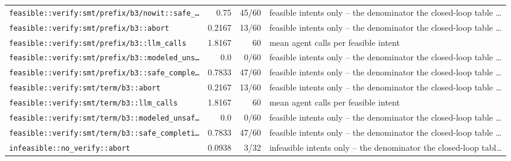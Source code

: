 \begin{center}
\begin{longtable}{@{}p{}rrp{}@{}}
\texttt{\scriptsize feasible:\allowbreak :\allowbreak verify:\allowbreak smt/\allowbreak prefix/\allowbreak b3/\allowbreak nowit:\allowbreak :\allowbreak safe\_\allowbreak …} & 0.75 & 45/60 & feasible intents only -- the denominator the closed-loop table … \\
\texttt{\scriptsize feasible:\allowbreak :\allowbreak verify:\allowbreak smt/\allowbreak prefix/\allowbreak b3:\allowbreak :\allowbreak abort} & 0.2167 & 13/60 & feasible intents only -- the denominator the closed-loop table … \\
\texttt{\scriptsize feasible:\allowbreak :\allowbreak verify:\allowbreak smt/\allowbreak prefix/\allowbreak b3:\allowbreak :\allowbreak llm\_\allowbreak calls} & 1.8167 & 60 & mean agent calls per feasible intent \\
\texttt{\scriptsize feasible:\allowbreak :\allowbreak verify:\allowbreak smt/\allowbreak prefix/\allowbreak b3:\allowbreak :\allowbreak modeled\_\allowbreak uns…} & 0.0 & 0/60 & feasible intents only -- the denominator the closed-loop table … \\
\texttt{\scriptsize feasible:\allowbreak :\allowbreak verify:\allowbreak smt/\allowbreak prefix/\allowbreak b3:\allowbreak :\allowbreak safe\_\allowbreak comple…} & 0.7833 & 47/60 & feasible intents only -- the denominator the closed-loop table … \\
\texttt{\scriptsize feasible:\allowbreak :\allowbreak verify:\allowbreak smt/\allowbreak term/\allowbreak b3:\allowbreak :\allowbreak abort} & 0.2167 & 13/60 & feasible intents only -- the denominator the closed-loop table … \\
\texttt{\scriptsize feasible:\allowbreak :\allowbreak verify:\allowbreak smt/\allowbreak term/\allowbreak b3:\allowbreak :\allowbreak llm\_\allowbreak calls} & 1.8167 & 60 & mean agent calls per feasible intent \\
\texttt{\scriptsize feasible:\allowbreak :\allowbreak verify:\allowbreak smt/\allowbreak term/\allowbreak b3:\allowbreak :\allowbreak modeled\_\allowbreak unsaf…} & 0.0 & 0/60 & feasible intents only -- the denominator the closed-loop table … \\
\texttt{\scriptsize feasible:\allowbreak :\allowbreak verify:\allowbreak smt/\allowbreak term/\allowbreak b3:\allowbreak :\allowbreak safe\_\allowbreak completi…} & 0.7833 & 47/60 & feasible intents only -- the denominator the closed-loop table … \\
\texttt{\scriptsize infeasible:\allowbreak :\allowbreak no\_\allowbreak verify:\allowbreak :\allowbreak abort} & 0.0938 & 3/32 & infeasible intents only -- the denominator the closed-loop tabl… \\

\end{longtable}
\end{center}
